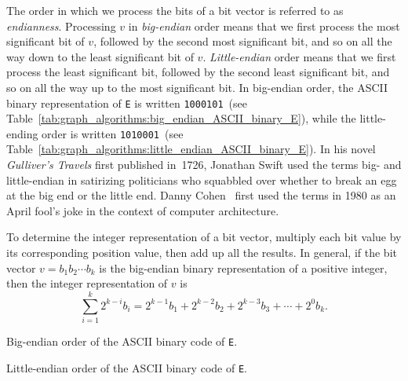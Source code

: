 The order in which we process the bits of a bit vector is referred to
as \emph{endianness}. Processing $v$ in
\emph{big-endian} order means that we first process
the most significant bit of $v$, followed by the second most
significant bit, and so on all the way down to the least significant
bit of $v$. \emph{Little-endian} order means that
we first process the least significant bit, followed by the second
least significant bit, and so on all the way up to the most
significant bit. In big-endian order, the ASCII binary
representation of \texttt{E} is written \texttt{1000101}~(see
Table~\ref{tab:graph_algorithms:big_endian_ASCII_binary_E}), while
the little-ending order is written \texttt{1010001}~(see
Table~\ref{tab:graph_algorithms:little_endian_ASCII_binary_E}). In his
novel \emph{Gulliver's Travels} first
published in~1726, Jonathan Swift used the
terms big- and little-endian in
satirizing politicians who squabbled over whether to break an egg at
the big end or the little end. Danny
Cohen~\cite{Cohen1980,Cohen1981} first used the
terms in 1980 as an April fool's joke in the context of computer
architecture.

To determine the integer representation of a bit vector, multiply each
bit value by its corresponding position value, then add up all the
results. In general, if the bit vector $v = b_1 b_2 \cdots b_k$ is the
big-endian binary representation of a positive integer, then the
integer representation of $v$ is
\begin{equation}
\label{eq:graph_algorithms:big_endian_binary_to_integer}
\sum_{i=1}^k 2^{k-i} b_i
=
2^{k-1} b_1 + 2^{k-2} b_2 + 2^{k-3} b_3 + \cdots + 2^0 b_k.
\end{equation}

\begin{table}[!htbp]
\centering

\caption{Big-endian order of the ASCII binary code of \texttt{E}.}
\label{tab:graph_algorithms:big_endian_ASCII_binary_E}
\end{table}

\begin{table}[!htbp]
\centering

\caption{Little-endian order of the ASCII binary code of \texttt{E}.}
\label{tab:graph_algorithms:little_endian_ASCII_binary_E}
\end{table}

